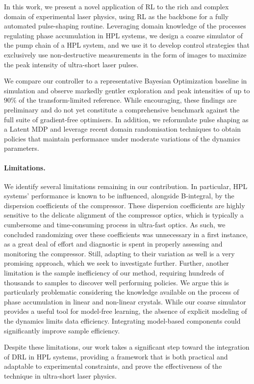 In this work, we present a novel application of RL to the rich and complex domain of experimental laser physics, using RL as the backbone for a fully automated pulse-shaping routine. Leveraging domain knowledge of the processes regulating phase accumulation in HPL systems, we design a coarse simulator of the pump chain of a HPL system, and we use it to develop control strategies that exclusively use non-destructive measurements in the form of images to maximize the peak intensity of ultra-short laser pulses.

We compare our controller to a representative Bayesian Optimization baseline in simulation and observe markedly gentler exploration and peak intensities of up to $90\%$ of the transform-limited reference. While encouraging, these findings are preliminary and do not yet constitute a comprehensive benchmark against the full suite of gradient-free optimisers. In addition, we reformulate pulse shaping as a Latent MDP and leverage recent domain randomisation techniques to obtain policies that maintain performance under moderate variations of the dynamics parameters.

\paragraph{Limitations.}
We identify several limitations remaining in our contribution. In particular, HPL systems' performance is known to be influenced, alongside B-integral, by the dispersion coefficients of the compressor. These dispersion coefficients are highly sensitive to the delicate alignment of the compressor optics, which is typically a cumbersome and time-consuming process in ultra-fast optics. As such, we concluded randomizing over these coefficients was unnecessary in a first instance, as a great deal of effort and diagnostic is spent in properly assessing and monitoring the compressor. Still, adapting to their variation as well is a very promising approach, which we seek to investigate further. Further, another limitation is the sample inefficiency of our method, requiring hundreds of thousands to samples to discover well performing policies. We argue this is particularly problematic considering the knowledge available on the process of phase accumulation in linear and non-linear crystals. While our coarse simulator provides a useful tool for model-free learning, the absence of explicit modeling of the dynamics limits data efficiency. Integrating model-based components could significantly improve sample efficiency.

Despite these limitations, our work takes a significant step toward the integration of DRL in HPL systems, providing a framework that is both practical and adaptable to experimental constraints, and prove the effectiveness of the technique in ultra-short laser physics.